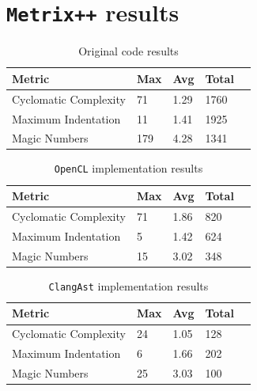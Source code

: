 \section{\texttt{Metrix++} results}

\begin{table}[H]
    \centering
    \begin{tabular}{@{}lllll@{}}
        \toprule
        \textbf{Metric}       & \textbf{Max} & \textbf{Avg} & \textbf{Total} \\ \midrule
        Cyclomatic Complexity & 71           & 1.29         & 1760           \\
        Maximum Indentation   & 11           & 1.41         & 1925           \\
        Magic Numbers         & 179          & 4.28         & 1341           \\ \bottomrule
    \end{tabular}
    \caption{\label{table:original-metrics}Original code results}
\end{table}

\begin{table}[H]
    \centering
    \begin{tabular}{@{}lllll@{}}
        \toprule
        \textbf{Metric}       & \textbf{Max} & \textbf{Avg} & \textbf{Total} \\ \midrule
        Cyclomatic Complexity & 71           & 1.86         & 820           \\
        Maximum Indentation   & 5            & 1.42         & 624            \\
        Magic Numbers         & 15           & 3.02         & 348           \\ \bottomrule
    \end{tabular}
    \caption{\label{table:opencl-metrics}\texttt{OpenCL} implementation results}
\end{table}

\begin{table}[H]
    \centering
    \begin{tabular}{@{}lllll@{}}
        \toprule
        \textbf{Metric}       & \textbf{Max} & \textbf{Avg} & \textbf{Total} \\ \midrule
        Cyclomatic Complexity & 24           & 1.05         & 128            \\
        Maximum Indentation   & 6            & 1.66         & 202           \\
        Magic Numbers         & 25           & 3.03         & 100           \\ \bottomrule
    \end{tabular}
    \caption{\label{table:clangast-metrics}\texttt{ClangAst} implementation results}
\end{table}

